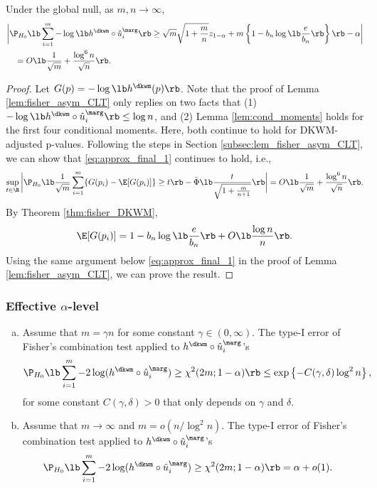 \begin{lemma}\label{lem:fisher_dkwm_CLT}
  Under the global null, as $m, n\rightarrow \infty$,
  \begin{align*}
    &\bigg|\P_{H_0}\lb \sum_{i=1}^{m}-\log\lb h^{\dkwm}\circ \hat{u}^\marg_i\rb\ge \sqrt{m}\sqrt{1 + \frac{m}{n}}z_{1- \alpha} + m \left\{ 1 - b_n\log\lb\frac{e}{b_n}\rb\right\}\rb - \alpha\bigg|\\
    & \quad = O\lb \frac{1}{\sqrt{m}} + \frac{\log^6 n}{\sqrt{n}}\rb.
  \end{align*}
\end{lemma}
\begin{proof}
  Let $G(p) = -\log\lb h^{\dkwm}(p)\rb$. Note that the proof of Lemma \ref{lem:fisher_asym_CLT} only replies on two facts that (1) $-\log\lb h^{\dkwm}\circ \hat{u}^\marg_i\rb\le \log n$, and (2) Lemma \ref{lem:cond_moments} holds for the first four conditional moments. Here, both continue to hold for DKWM-adjusted p-values. Following the steps in Section \ref{subsec:lem_fisher_asym_CLT}, we can show that \eqref{eq:approx_final_1} continues to hold, i.e.,
  \begin{equation}\label{eq:approx_dkwm}
  \sup_{t\in \R}\bigg|\P_{H_0}\lb \frac{1}{\sqrt{m}}\sum_{i=1}^{m}\{G(p_i) - \E[G(p_i)]\} \ge t \rb - \bar{\Phi}\lb \frac{t}{\sqrt{1 + \frac{m}{n+1}}}\rb\bigg| = O\lb \frac{1}{\sqrt{m}} + \frac{\log^6 n}{\sqrt{n}}\rb.
\end{equation}
By Theorem \ref{thm:fisher_DKWM},
\[\E[G(p_i)] = 1 - b_n\log\lb\frac{e}{b_n}\rb + O\lb\frac{\log n}{n}\rb.\]
Using the same argument below \eqref{eq:approx_final_1} in the proof of Lemma \ref{lem:fisher_asym_CLT}, we can prove the result.
\end{proof}

\subsubsection{Effective $\alpha$-level}
\begin{thm}\label{thm:fisher_dkwm_effective_alpha}
  \begin{enumerate}[(a)]
  \item  Assume that $m = \gamma n$ for some constant $\gamma \in (0, \infty)$. The type-I error of Fisher's combination test applied to $h^\dkwm\circ \hat{u}_i^\marg$'s
    \[\P_{H_0}\lb\sum_{i=1}^{m} -2\log(h^\dkwm \circ \hat{u}_i^\marg)\ge \chi^2(2m; 1 - \alpha)\rb \le \exp\left\{-C(\gamma, \delta)\log^2 n\right\},\]
    for some constant $C(\gamma, \delta) > 0$ that only depends on $\gamma$ and $\delta$.
  \item Assume that $m \rightarrow \infty$ and $m = o(n / \log^2 n)$. The type-I error of Fisher's combination test applied to $h^\dkwm\circ \hat{u}_i^\marg$'s
  \begin{align*}
    &\P_{H_0}\lb\sum_{i=1}^{m} -2\log(h^\dkwm \circ \hat{u}_i^\marg)\ge \chi^2(2m; 1 - \alpha)\rb = \alpha + o(1).
  \end{align*}
  \end{enumerate}
\end{thm}

